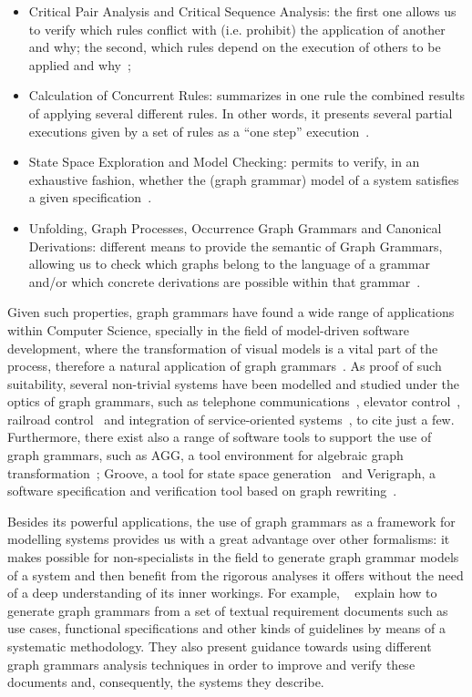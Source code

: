 \begin{itemize}
  \item Critical Pair Analysis and Critical Sequence Analysis: the first one allows us to verify which rules conflict with (i.e. prohibit) the application of another and why; the second, which rules depend on the execution of others to be applied and why~\cite{Lambers2008a};
  \item Calculation of Concurrent Rules: summarizes in one rule the combined results of applying several different rules. In other words, it presents several partial executions given by a set of rules as a ``one step'' execution~\cite{Lambers2008,BezerraETMF2016}.
  \item State Space Exploration and Model Checking: permits to verify, in an exhaustive fashion, whether the (graph grammar) model of a system satisfies a given specification~\cite{Rensink2004}.
  \item Unfolding, Graph Processes, Occurrence Graph Grammars and Canonical Derivations: different means to provide the semantic of Graph Grammars, allowing us to check which graphs belong to the language of a grammar and/or which concrete derivations are possible within that grammar~\cite{Corradini1996,Ribeiro1996}.
\end{itemize}

Given such properties, graph grammars have found a wide range of applications within Computer Science, specially in the field of model-driven software development, where the transformation of visual models is a vital part of the process, therefore a natural application of graph grammars~\cite{Rozenberg1997}. As proof of such suitability, several non-trivial systems have been modelled and studied under the optics of graph grammars, such as telephone communications~\cite{Ribeiro1996}, elevator control~\cite{Lambers2010}, railroad control~\cite{Pennemann2009} and integration of service-oriented systems~\cite{Giese2015}, to cite just a few. Furthermore, there exist also a range of software tools to support the use of graph grammars, such as AGG, a tool environment for algebraic graph transformation~\cite{Taentzer2000}; Groove, a tool for state space generation~\cite{Rensink2004} and Verigraph, a software specification and verification tool based on graph rewriting~\cite{verigraph}.

Besides its powerful applications, the use of graph grammars as a framework for modelling systems provides us with a great advantage over other formalisms: it makes possible for non-specialists in the field to generate graph grammar models of a system and then benefit from the rigorous analyses it offers without the need of a deep understanding of its inner workings. For example, ~\cite{Junior2015,BezerraWEIT2016,Cota2017} explain how to generate graph grammars from a set of textual requirement documents such as use cases, functional specifications and other kinds of guidelines by means of a systematic methodology. They also present guidance towards using different graph grammars analysis techniques in order to improve and verify these documents and, consequently, the systems they describe.

